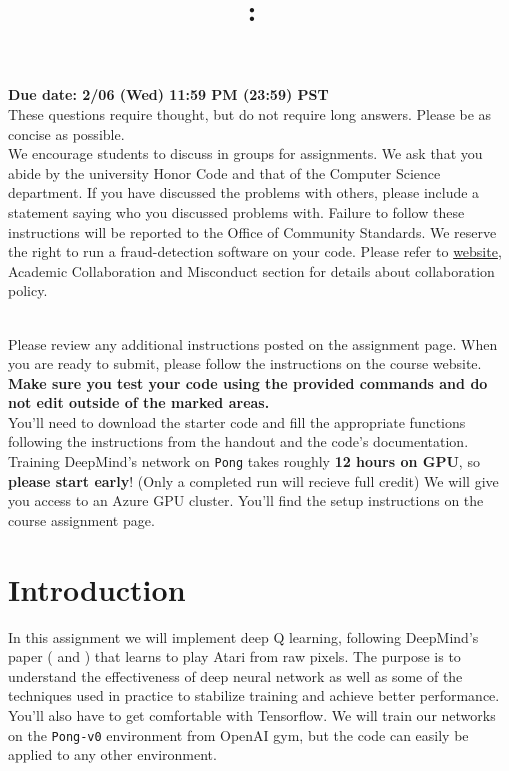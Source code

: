 \documentclass{article}
\title{
\vspace{-1in}
\textmd{\textbf{\hmwkClass:\ \hmwkTitle}}}
\author{}
\date{} %
\begin{document}
\maketitle
\vspace{-.5in}
\begin{framed}
{\bf Due date: 2/06 (Wed) 11:59 PM (23:59) PST}
\\[1em]
These questions require thought, but do not require long answers. Please be as concise as possible.
\\[1em]
We encourage students to discuss in groups for assignments. We ask
that you abide by the university Honor Code and that of the Computer Science department. If you have discussed the problems with others,
please include a statement saying who you discussed problems with. Failure to follow these instructions
will be reported to the Office of Community Standards. We reserve the right to run a fraud-detection software on your code. Please refer to \href{http://web.stanford.edu/class/cs234/index.html}{website}, Academic Collaboration and Misconduct section for details about collaboration policy.

\ \\[1em]
Please review any additional instructions posted on the assignment page. When you are ready to submit, please
follow the instructions on the course website. \textbf{Make sure you test your code using the
provided commands and do not edit outside of the marked areas.}
\\[1em]
You'll need to download the starter code and fill the appropriate functions following the instructions from the handout and the code's documentation. Training DeepMind's network on \texttt{Pong} takes roughly \textbf{12 hours on GPU}, so \textbf{please start early}! (Only a completed run will recieve full credit) We will give you access to an Azure GPU cluster. You'll find the setup instructions on the course assignment page.
\end{framed}
\section*{Introduction}

In this assignment we will implement deep Q learning, following DeepMind's paper (\cite{mnih2015human} and \cite{mnih-atari-2013}) that learns to play Atari from raw pixels. The purpose is to understand the effectiveness of deep neural network as well as some of the techniques used in practice to stabilize training and achieve better performance. You'll also have to get comfortable with Tensorflow. We will train our networks on the \texttt{Pong-v0} environment from OpenAI gym, but the code can easily be applied to any other environment. \\
\end{document}
